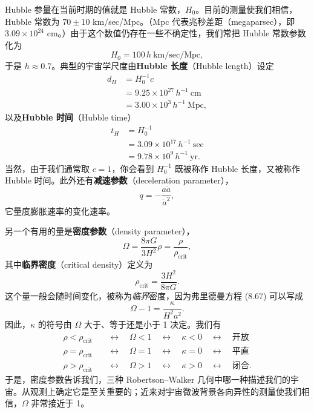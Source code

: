 Hubble 参量在当前时期的值就是 Hubble 常数，$H_0$。目前的测量使我们相信，Hubble 常数为 $70\pm10$ km/sec/Mpc。（Mpc 代表兆秒差距（megaparsec），即 $3.09\times10^{24}$ cm。）由于这个数值仍存在一些不确定性，我们常把 Hubble 常数参数化为
\begin{equation*}
H_0 = 100\,h\ \mathrm{km/sec/Mpc},
\tag{8.70}
\end{equation*}
于是 $h\approx0.7$。典型的宇宙学尺度由\textbf{Hubble 长度}（Hubble length）设定
\begin{align*}
d_H &= H_0^{-1}c \\
&= 9.25\times10^{27}\,h^{-1}\ \mathrm{cm} \\
&= 3.00\times10^{3}\,h^{-1}\ \mathrm{Mpc},
\tag{8.71}
\end{align*}
以及\textbf{Hubble 时间}（Hubble time）
\begin{align*}
t_H &= H_0^{-1} \\
&= 3.09\times10^{17}\,h^{-1}\ \mathrm{sec} \\
&= 9.78\times10^{9}\,h^{-1}\ \mathrm{yr}.
\tag{8.72}
\end{align*}
当然，由于我们通常取 $c=1$，你会看到 $H_0^{-1}$ 既被称作 Hubble 长度，又被称作 Hubble 时间。此外还有\textbf{减速参数}（deceleration parameter），
\begin{equation*}
q = -\frac{a\ddot{a}}{\dot{a}^{2}},
\tag{8.73}
\end{equation*}
它量度膨胀速率的变化速率。

另一个有用的量是\textbf{密度参数}（density parameter），
\begin{equation*}
\boxed{\,\Omega = \frac{8\pi G}{3H^{2}}\rho = \frac{\rho}{\rho_{\mathrm{crit}}},\,}
\tag{8.74}
\end{equation*}
其中\textbf{临界密度}（critical density）定义为
\begin{equation*}
\rho_{\mathrm{crit}} = \frac{3H^{2}}{8\pi G}.
\tag{8.75}
\end{equation*}
这个量一般会随时间变化，被称为\emph{临界}密度，因为弗里德曼方程 (8.67) 可以写成
\begin{equation*}
\Omega - 1 = \frac{\kappa}{H^{2}a^{2}}.
\tag{8.76}
\end{equation*}
因此，$\kappa$ 的符号由 $\Omega$ 大于、等于还是小于 1 决定。我们有
\begin{align*}
\rho < \rho_{\mathrm{crit}} \quad&\leftrightarrow\quad \Omega < 1 \quad\leftrightarrow\quad \kappa < 0 \quad\leftrightarrow\quad \text{开放} \\
\rho = \rho_{\mathrm{crit}} \quad&\leftrightarrow\quad \Omega = 1 \quad\leftrightarrow\quad \kappa = 0 \quad\leftrightarrow\quad \text{平直} \\
\rho > \rho_{\mathrm{crit}} \quad&\leftrightarrow\quad \Omega > 1 \quad\leftrightarrow\quad \kappa > 0 \quad\leftrightarrow\quad \text{闭合}.
\end{align*}
于是，密度参数告诉我们，三种 Robertson--Walker 几何中哪一种描述我们的宇宙。从观测上确定它是至关重要的；近来对宇宙微波背景各向异性的测量使我们相信，$\Omega$ 非常接近于 1。

